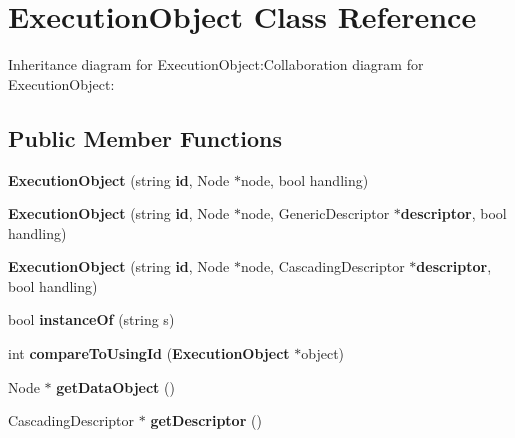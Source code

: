 \section{ExecutionObject Class Reference}
\label{classbr_1_1pucrio_1_1telemidia_1_1ginga_1_1ncl_1_1model_1_1components_1_1ExecutionObject}
Inheritance diagram for ExecutionObject:Collaboration diagram for ExecutionObject:\subsection*{Public Member Functions}
\begin{CompactItemize}
\item 
\textbf{ExecutionObject} (string {\bf id}, Node $\ast$node, bool handling)\label{classbr_1_1pucrio_1_1telemidia_1_1ginga_1_1ncl_1_1model_1_1components_1_1ExecutionObject_f32d95a02deb617e36b003accdd622b3}

\item 
\textbf{ExecutionObject} (string {\bf id}, Node $\ast$node, GenericDescriptor $\ast${\bf descriptor}, bool handling)\label{classbr_1_1pucrio_1_1telemidia_1_1ginga_1_1ncl_1_1model_1_1components_1_1ExecutionObject_6aa2df837674f7aa27a8da45f08d36eb}

\item 
\textbf{ExecutionObject} (string {\bf id}, Node $\ast$node, CascadingDescriptor $\ast${\bf descriptor}, bool handling)\label{classbr_1_1pucrio_1_1telemidia_1_1ginga_1_1ncl_1_1model_1_1components_1_1ExecutionObject_c5ea41b7d9fad8e6cf1286b109fda55a}

\item 
bool \textbf{instanceOf} (string s)\label{classbr_1_1pucrio_1_1telemidia_1_1ginga_1_1ncl_1_1model_1_1components_1_1ExecutionObject_4081cb1ebb5adebc1d0858ff6f69af0d}

\item 
int \textbf{compareToUsingId} ({\bf ExecutionObject} $\ast$object)\label{classbr_1_1pucrio_1_1telemidia_1_1ginga_1_1ncl_1_1model_1_1components_1_1ExecutionObject_6ccd7186a6016b1ab95245b4db5cb282}

\item 
Node $\ast$ \textbf{getDataObject} ()\label{classbr_1_1pucrio_1_1telemidia_1_1ginga_1_1ncl_1_1model_1_1components_1_1ExecutionObject_def2bb13e3dd53b0f099271e32f8dc34}

\item 
CascadingDescriptor $\ast$ \textbf{getDescriptor} ()\label{classbr_1_1pucrio_1_1telemidia_1_1ginga_1_1ncl_1_1model_1_1components_1_1ExecutionObject_e1a998040ee4da2f71dd846ceb41b35a}


\end{CompactItemize}
